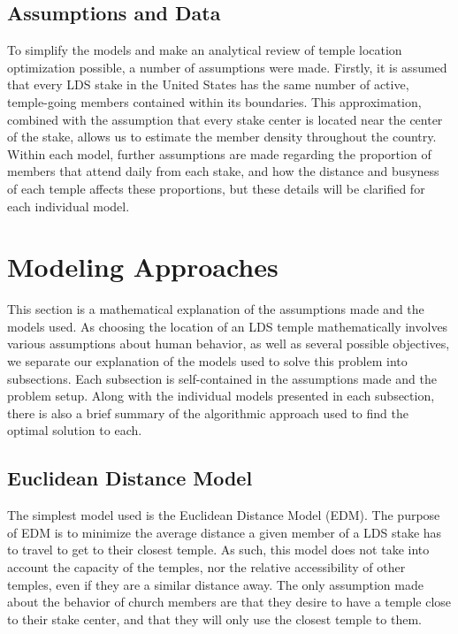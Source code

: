 \documentclass[twoside,twocolumn]{article}
\begin{document}
\subsection{Assumptions and Data}
To simplify the models and make an analytical review of temple location optimization possible, a number of assumptions were made. Firstly, it is assumed that every LDS stake in the United States has the same number of active, temple-going members contained within its boundaries. This approximation, combined with the assumption that every stake center is located near the center of the stake, allows us to estimate the member density throughout the country. Within each model, further assumptions are made regarding the proportion of members that attend daily from each stake, and how the distance and busyness of each temple affects these proportions, but these details will be clarified for each individual model.

\section{Modeling Approaches}
\label{sec:models}
This section is a mathematical explanation of the assumptions made and the models used. As choosing the location of an LDS temple mathematically involves various assumptions about human behavior, as well as several possible objectives, we separate our explanation of the models used to solve this problem into subsections. Each subsection is self-contained in the assumptions made and the problem setup. Along with the individual models presented in each subsection, there is also a brief summary of the algorithmic approach used to find the optimal solution to each.

\subsection{Euclidean Distance Model} %

The simplest model used is the Euclidean Distance Model (EDM). The purpose of EDM is to minimize the average distance a given member of a LDS stake has to travel to get to their closest temple. As such, this model does not take into account the capacity of the temples, nor the relative accessibility of other temples, even if they are a similar distance away. The only assumption made about the behavior of church members are that they desire to have a temple close to their stake center, and that they will only use the closest temple to them.
\end{document}

